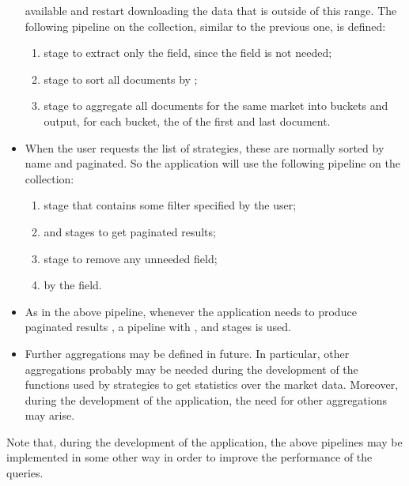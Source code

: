 \begin{itemize}
		available and restart downloading the data that is outside of
		this range. The following pipeline on the 
		collection, similar to the previous one, is defined:
		\begin{enumerate}
			\item {} stage to extract only the
				 field, since the  field
				is not needed;
			\item {} stage to sort all documents by
				;
			\item {} stage to aggregate all documents
				for the same market into buckets and output, for
				each bucket, the  of the first and
				last document.
		\end{enumerate}
	\item When the user requests the list of strategies, these are normally
		sorted by name and paginated. So the application will use the
		following pipeline on the  collection:
		\begin{enumerate}
			\item {} stage that contains some filter
				specified by the user;
			\item {} and  stages to get
				paginated results;
			\item {} stage to remove any unneeded
				field;
			\item {} by the  field.
		\end{enumerate}
	\item As in the above pipeline, whenever the application needs to
		produce paginated results , a pipeline with , 
		and  stages is used.
	\item Further aggregations may be defined in future. In particular,
		other aggregations probably may be needed during the development
		of the functions used by strategies to get statistics over the
		market data. Moreover, during the development of the
		application, the need for other aggregations may arise.
\end{itemize}

Note that, during the development of the application, the above pipelines may be
implemented in some other way 
in order to improve the performance of the queries.

